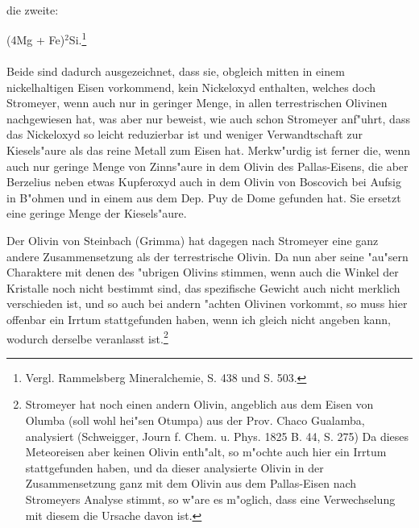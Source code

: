 \documentclass[a4paper, 11pt, oneside, german]{article}
\begin{document}
\paragraph{}
die zweite:
\begin{center}
(4Mg + Fe)$^{2}$Si.\footnote{Vergl. Rammelsberg Mineralchemie, S. 438 und S. 503.}
\end{center}
\paragraph{}
Beide sind dadurch ausgezeichnet, dass sie, obgleich mitten in einem nickelhaltigen Eisen vorkommend, kein Nickeloxyd enthalten, welches doch Stromeyer, wenn auch nur in geringer Menge, in allen terrestrischen Olivinen nachgewiesen hat, was aber nur beweist, wie auch schon Stromeyer anf"uhrt, dass das Nickeloxyd so leicht reduzierbar ist und weniger Verwandtschaft zur Kiesels"aure als das reine Metall zum Eisen hat. Merkw"urdig ist ferner die, wenn auch nur geringe Menge von Zinns"aure in dem Olivin des Pallas-Eisens, die aber Berzelius neben etwas Kupferoxyd auch in dem Olivin von Boscovich bei Aufsig in B"ohmen und in einem aus dem Dep. Puy de Dome gefunden hat. Sie ersetzt eine geringe Menge der Kiesels"aure.

Der Olivin von Steinbach (Grimma) hat dagegen nach Stromeyer eine ganz andere Zusammensetzung als der terrestrische Olivin. Da nun aber seine "au"sern Charaktere mit denen des "ubrigen Olivins stimmen, wenn auch die Winkel der Kristalle noch nicht bestimmt sind, das spezifische Gewicht auch nicht merklich verschieden ist, und so auch bei andern "achten Olivinen vorkommt, so muss hier offenbar ein Irrtum stattgefunden haben, wenn ich gleich nicht angeben kann, wodurch derselbe veranlasst ist.\footnote{Stromeyer hat noch einen andern Olivin, angeblich aus dem Eisen von Olumba (soll wohl hei"sen Otumpa) aus der Prov. Chaco Gualamba, analysiert (Schweigger, Journ f. Chem. u. Phys. 1825 B. 44, S. 275) Da dieses Meteoreisen aber keinen Olivin enth"alt, so m"ochte auch hier ein Irrtum stattgefunden haben, und da dieser analysierte Olivin in der Zusammensetzung ganz mit dem Olivin aus dem Pallas-Eisen nach Stromeyers Analyse stimmt, so w"are es m"oglich, dass eine Verwechselung mit diesem die Ursache davon ist.}
\end{document}
